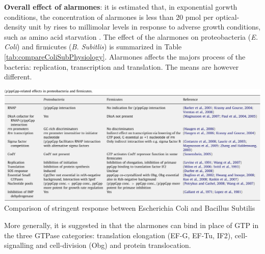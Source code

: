 \medskip

{\bf Overall effect of alarmones}: it is estimated that, in exponential gorwth conditions, the concentration of alarmones is less than 20 pmol per optical-density unit by rises to millimolar levels in response to adverse growth conditions, such as amino acid starvation \citep{ababneh_rela_2015}. The effect of the alarmones on proteobacteria ({\it E. Coli}) and firmicutes ({\it B. Subitlis}) is summarized in Table \ref{tab:compareColiSubPhysiology}. Alarmones affects the majors process of the bacteria: replication, transcription and translation. The means are however different.
\begin{table}[hbtp]
  \centering
  \includegraphics[width=17cm]{figure/compareStringentColiSubtilisTable.png}\\
  \caption{Comparison of stringent response between Escherichia Coli and Bacillus Subtilis \citep{wolz_synthesis_2010}}\label{tab:compareColiSubPhysiology}
\end{table}
More generally, it is suggested in \citep{kanjee_direct_2012} that the alarmones can bind in place of GTP in the three GTPase categories: translation elongation (EF-G, EF-Tu, IF2), cell-signalling and cell-division (Obg) and protein translocation.

\medskip

